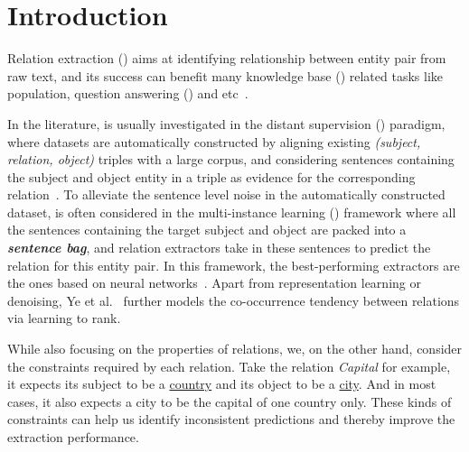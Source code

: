\section{Introduction}

Relation extraction (\RE) aims at identifying relationship between entity pair from raw text, and its success can benefit  many knowledge base (\KB) related tasks like \KB population, question answering (\QA) and etc~\cite{suchanek2013advances}.

In the literature, \RE is usually investigated in the distant supervision (\DS) paradigm, where datasets are automatically constructed by aligning existing \KB \emph{(subject, relation, object)} triples with a large corpus, and considering sentences containing the subject and object entity in a triple as evidence for the corresponding relation~\cite{mintz2009distant}.
To alleviate the sentence level noise in the automatically constructed dataset, \RE is often considered in the multi-instance learning (\MIL) framework where all the sentences containing the target subject and object are packed into a \textbf{\emph{sentence bag}}, and relation extractors take in these sentences to predict the relation for this entity pair. 
In this framework, the best-performing extractors are the ones based on neural networks~\cite{zeng2015distant,lin2016neural,zeng2018large}.
Apart from representation learning or denoising,
Ye et al.~ further models the co-occurrence tendency between relations via learning to rank.

While also focusing on the properties of relations, we, on the other hand, consider the  constraints required by each relation.
Take the relation \emph{Capital} for example, it expects its subject to be a \underline{country} and its object to be a \underline{city}.
And in most cases, it also expects a city to be the capital of one country only.
These kinds of constraints can help us identify inconsistent predictions and thereby improve the extraction performance.


